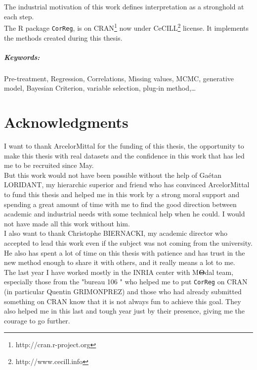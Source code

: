 \documentclass[12pt,a4paper]{report}
\begin{document}
	The industrial motivation of this work defines interpretation as a stronghold at each step. 	
	\\
	The R package {\tt CorReg}, is on CRAN\footnote{http://cran.r-project.org} now under CeCILL\footnote{http://www.cecill.info} license. It implements the methods created during this thesis.
	
	 	
\paragraph{Keywords:} Pre-treatment, Regression, Correlations, Missing values, MCMC, generative model, Bayesian Criterion, variable selection, plug-in method,\dots
	

\chapter*{Acknowledgments}
	I want to thank ArcelorMittal for the funding of this thesis, the opportunity to make this thesis with real datasets and the confidence in this work that has led me to be recruited since May.%
	\\
	
	But this work would not have been possible without the help of Gaétan LORIDANT, my hierarchic superior and friend who has convinced ArcelorMittal to fund this thesis and helped me in this work by a strong moral support and spending a great amount of time with me to find the good direction between academic and industrial needs with some technical help when he could. I would not have made all this work without him.\\
	
	I also want to thank Christophe BIERNACKI, my academic director who accepted to lead this work even if the subject was not coming from the university. He also has spent a lot of time on this thesis with patience and has trust in the new method enough to share it with others, and it really means a lot to me. \\
	
	The last year I have worked mostly in the INRIA center with M$\boldsymbol{\Theta}$dal team, especially those from the "bureau 106 " who helped me to put {\tt CorReg} on CRAN (in particular Quentin GRIMONPREZ) and those who had already submitted something on CRAN know that it is not always fun to achieve this goal. They also helped me in this last and tough year just by their presence, giving me the courage to go further. \\
	
\end{document}
